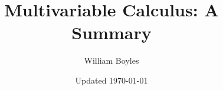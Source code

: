 


	\title{Multivariable Calculus: A Summary}
	\author{William Boyles}
	\date{Updated \today}
	
	\frontmatter
		\maketitle
		\tableofcontents
	
	\mainmatter
		
		
		
		
		
		
		
		
		
	\appendix
	
	\backmatter

